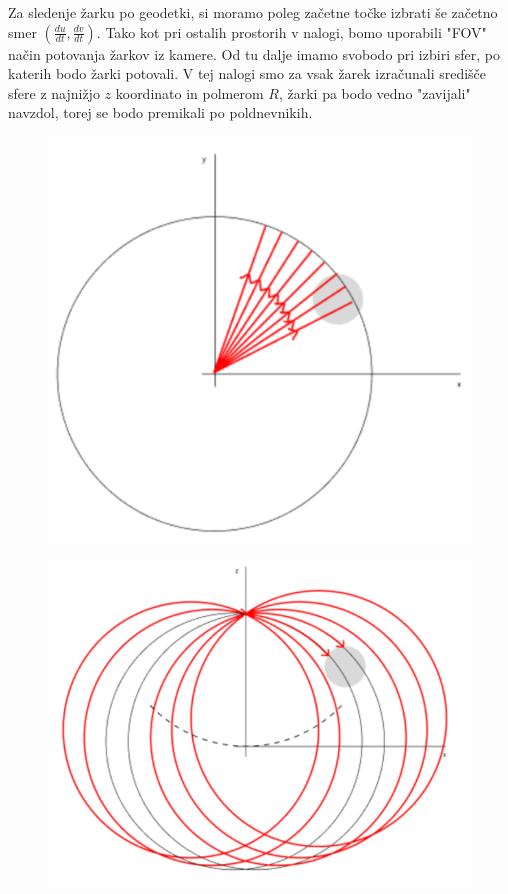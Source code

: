 \documentclass[titlepage]{article}
\begin{document}
Za sledenje žarku po geodetki, si moramo poleg začetne točke izbrati še začetno smer
\(\left( \frac{du}{dt}, \frac{dv}{dt} \right) \). Tako kot pri ostalih prostorih v nalogi, bomo uporabili "FOV" način
potovanja žarkov iz kamere. Od tu dalje imamo svobodo pri izbiri sfer, po katerih bodo žarki potovali. V tej nalogi smo za
vsak žarek izračunali središče sfere z najnižjo \( z \) koordinato in polmerom \( R \), žarki pa bodo vedno "zavijali" navzdol, torej se bodo premikali po poldnevnikih.

\begin{figure}[H]
\centering
\begin{minipage}{.5\textwidth}
  \centering
  \includegraphics[width=0.8\linewidth]{Images/rays_top.png}
  \label{fig:test1}
\end{minipage}%
\begin{minipage}{.5\textwidth}
  \centering
  \includegraphics[height=0.77\linewidth]{Images/rays_side.png}
  \label{fig:test2}
\end{minipage}
\end{figure}
\end{document}
